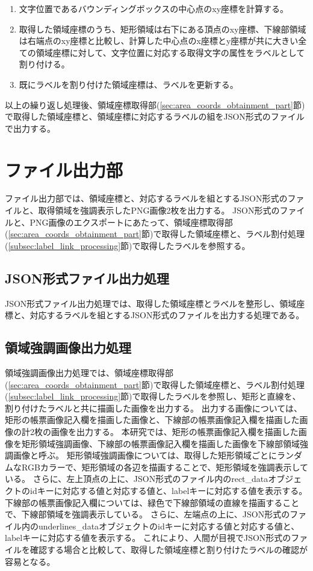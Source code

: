 \begin{enumerate}
    \item 文字位置であるバウンディングボックスの中心点のxy座標を計算する。
    \item 取得した領域座標のうち、矩形領域は右下にある頂点のxy座標、下線部領域は右端点のxy座標と比較し、計算した中心点のx座標とy座標が共に大きい全ての領域座標に対して、文字位置に対応する取得文字の属性をラベルとして割り付ける。
    \item 既にラベルを割り付けた領域座標は、ラベルを更新する。
\end{enumerate}

以上の繰り返し処理後、領域座標取得部(\ref{sec:area_coords_obtainment_part}節)で取得した領域座標と、領域座標に対応するラベルの組をJSON形式のファイルで出力する。

\section{ファイル出力部}\label{subsec:file_output_part}
ファイル出力部では、領域座標と、対応するラベルを組とするJSON形式のファイルと、取得領域を強調表示したPNG画像2枚を出力する。
JSON形式のファイルと、PNG画像のエクスポートにあたって、領域座標取得部(\ref{sec:area_coords_obtainment_part}節)で取得した領域座標と、ラベル割付処理(\ref{subsec:label_link_processing}節)で取得したラベルを参照する。


\subsection{JSON形式ファイル出力処理}\label{subsec:json_file_output_processing}
JSON形式ファイル出力処理では、取得した領域座標とラベルを整形し、領域座標と、対応するラベルを組とするJSON形式のファイルを出力する処理である。

\subsection{領域強調画像出力処理}\label{subsec:area_highlighted_image_output_processing}
領域強調画像出力処理では、領域座標取得部(\ref{sec:area_coords_obtainment_part}節)で取得した領域座標と、ラベル割付処理(\ref{subsec:label_link_processing}節)で取得したラベルを参照し、矩形と直線を、割り付けたラベルと共に描画した画像を出力する。
出力する画像については、矩形の帳票画像記入欄を描画した画像と、下線部の帳票画像記入欄を描画した画像の計2枚の画像を出力する。
本研究では、矩形の帳票画像記入欄を描画した画像を矩形領域強調画像、下線部の帳票画像記入欄を描画した画像を下線部領域強調画像と呼ぶ。
矩形領域強調画像については、取得した矩形領域ごとにランダムなRGBカラーで、矩形領域の各辺を描画することで、矩形領域を強調表示している。
さらに、左上頂点の上に、JSON形式のファイル内のrect\_dataオブジェクトのidキーに対応する値と対応する値と、labelキーに対応する値を表示する。
下線部の帳票画像記入欄については、緑色で下線部領域の直線を描画することで、下線部領域を強調表示している。
さらに、左端点の上に、JSON形式のファイル内のunderlines\_dataオブジェクトのidキーに対応する値と対応する値と、labelキーに対応する値を表示する。
これにより、人間が目視でJSON形式のファイルを確認する場合と比較して、取得した領域座標と割り付けたラベルの確認が容易となる。

